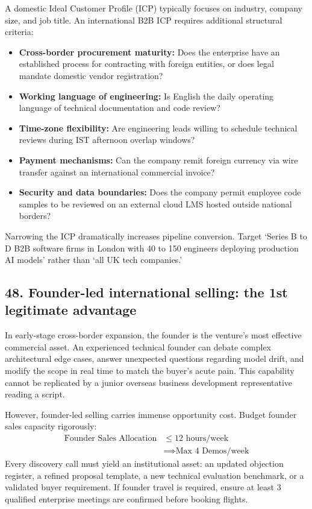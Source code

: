 A domestic Ideal Customer Profile (ICP) typically focuses on industry, company size, and job title. An international B2B ICP requires additional structural criteria:
\begin{itemize}
    \item \textbf{Cross-border procurement maturity:} Does the enterprise have an established process for contracting with foreign entities, or does legal mandate domestic vendor registration?
    \item \textbf{Working language of engineering:} Is English the daily operating language of technical documentation and code review?
    \item \textbf{Time-zone flexibility:} Are engineering leads willing to schedule technical reviews during IST afternoon overlap windows?
    \item \textbf{Payment mechanisms:} Can the company remit foreign currency via wire transfer against an international commercial invoice?
    \item \textbf{Security and data boundaries:} Does the company permit employee code samples to be reviewed on an external cloud LMS hosted outside national borders?
\end{itemize}
Narrowing the ICP dramatically increases pipeline conversion. Target `Series B to D B2B software firms in London with 40 to 150 engineers deploying production AI models' rather than `all UK tech companies.'

\subsection{48. Founder-led international selling: the 1st legitimate advantage}

In early-stage cross-border expansion, the founder is the venture's most effective commercial asset. An experienced technical founder can debate complex architectural edge cases, answer unexpected questions regarding model drift, and modify the scope in real time to match the buyer's acute pain. This capability cannot be replicated by a junior overseas business development representative reading a script.

However, founder-led selling carries immense opportunity cost. Budget founder sales capacity rigorously:
\begin{equation}
\begin{aligned}
\text{Founder Sales Allocation} &\le 12 \text{ hours/week} \\
&\implies \text{Max 4 Demos/week}
\end{aligned}
\end{equation}
Every discovery call must yield an institutional asset: an updated objection register, a refined proposal template, a new technical evaluation benchmark, or a validated buyer requirement. If founder travel is required, ensure at least 3 qualified enterprise meetings are confirmed before booking flights.

